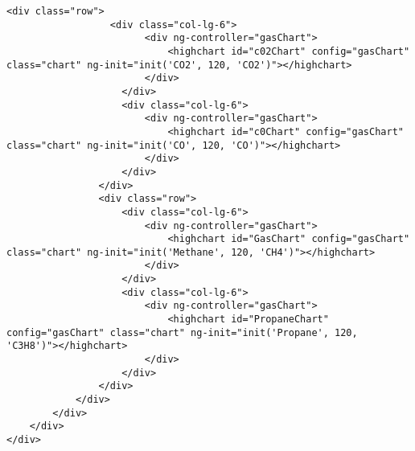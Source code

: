 \begin{lstlisting}[breaklines=true,basicstyle=\tiny]
                <div class="row">
                  <div class="col-lg-6">
                        <div ng-controller="gasChart">
                            <highchart id="c02Chart" config="gasChart" class="chart" ng-init="init('CO2', 120, 'CO2')"></highchart>
                        </div>
                    </div>
                    <div class="col-lg-6">
                        <div ng-controller="gasChart">
                            <highchart id="c0Chart" config="gasChart" class="chart" ng-init="init('CO', 120, 'CO')"></highchart>
                        </div>
                    </div>
                </div>
                <div class="row">
                    <div class="col-lg-6">
                        <div ng-controller="gasChart">
                            <highchart id="GasChart" config="gasChart" class="chart" ng-init="init('Methane', 120, 'CH4')"></highchart>
                        </div>
                    </div>
                    <div class="col-lg-6">
                        <div ng-controller="gasChart">
                            <highchart id="PropaneChart" config="gasChart" class="chart" ng-init="init('Propane', 120, 'C3H8')"></highchart>
                        </div>
                    </div>
                </div>
            </div>
        </div>
    </div>
</div>
\end{lstlisting}


